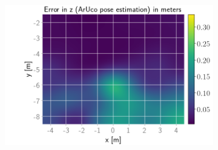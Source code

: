 \documentclass[../Head/report.tex]{subfiles}
\begin{document}
\begin{figure}[H]
    \hspace{-0.9em}
    \begin{subfigure}[t]{.337\textwidth}
        \centering
        \includegraphics[width=\textwidth]{../Figures/GPS2Vision_pose_estimation_test/test2_aruco_board_width_0.3_space_0.15/aruco_pose_estimation_error_z.png}
        \caption{}
        \label{fig:GPS2Vision_pose_estimation_test1_error_z}
    \end{subfigure}
    \caption{}
    \label{fig:GPS2Vision_pose_estimation_test2_error_pos}
\end{figure}
\end{document}
